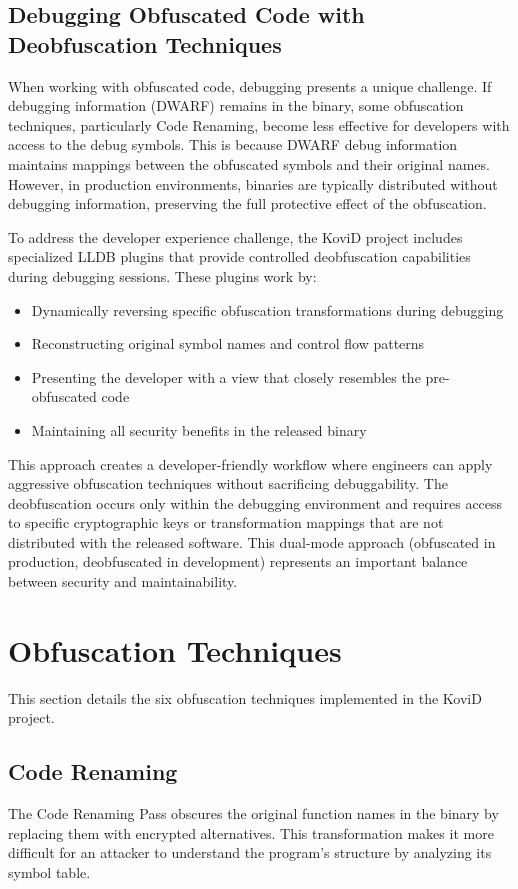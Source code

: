 \documentclass[conference]{IEEEtran}
\begin{document}
\subsection{Debugging Obfuscated Code with Deobfuscation Techniques}
When working with obfuscated code, debugging presents a unique challenge. If debugging information (DWARF) remains in the binary, some obfuscation techniques, particularly Code Renaming, become less effective for developers with access to the debug symbols. This is because DWARF debug information maintains mappings between the obfuscated symbols and their original names. However, in production environments, binaries are typically distributed without debugging information, preserving the full protective effect of the obfuscation.

To address the developer experience challenge, the KoviD project includes specialized LLDB plugins that provide controlled deobfuscation capabilities during debugging sessions. These plugins work by:

\begin{itemize}
    \item Dynamically reversing specific obfuscation transformations during debugging
    \item Reconstructing original symbol names and control flow patterns
    \item Presenting the developer with a view that closely resembles the pre-obfuscated code
    \item Maintaining all security benefits in the released binary
\end{itemize}

This approach creates a developer-friendly workflow where engineers can apply aggressive obfuscation techniques without sacrificing debuggability. The deobfuscation occurs only within the debugging environment and requires access to specific cryptographic keys or transformation mappings that are not distributed with the released software. This dual-mode approach (obfuscated in production, deobfuscated in development) represents an important balance between security and maintainability.

\section{Obfuscation Techniques}
This section details the six obfuscation techniques implemented in the KoviD project.

\subsection{Code Renaming}
The Code Renaming Pass obscures the original function names in the binary by replacing them with encrypted alternatives. This transformation makes it more difficult for an attacker to understand the program's structure by analyzing its symbol table.
\end{document}
